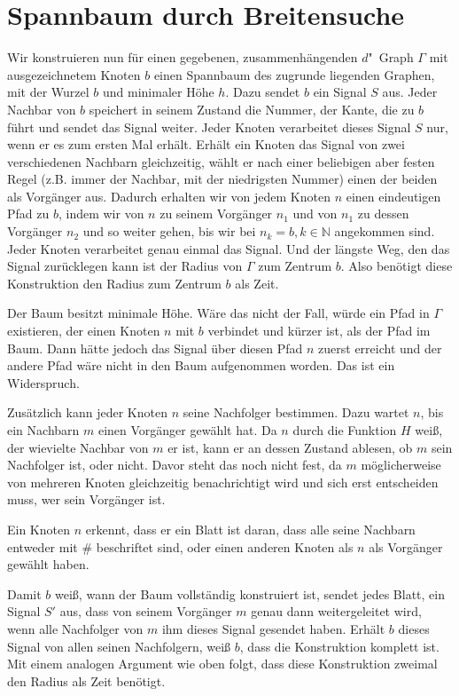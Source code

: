 \documentclass[11pt]{article}
\begin{document}
\section{Spannbaum durch Breitensuche}
Wir konstruieren nun für einen gegebenen, zusammenhängenden $d$"~Graph $\Gamma$ mit ausgezeichnetem Knoten $b$ einen Spannbaum des zugrunde liegenden Graphen, mit der Wurzel $b$ und minimaler Höhe $h$. 
Dazu sendet $b$ ein Signal $S$ aus. Jeder Nachbar von $b$ speichert in seinem Zustand die Nummer, der Kante, die zu $b$ führt und sendet das Signal weiter. 
Jeder Knoten verarbeitet dieses Signal $S$ nur, wenn er es zum ersten Mal erhält. 
Erhält ein Knoten das Signal von zwei verschiedenen Nachbarn gleichzeitig, wählt er nach einer beliebigen aber festen Regel (z.B. immer der Nachbar, mit der niedrigsten Nummer) einen der beiden als Vorgänger aus. 
Dadurch erhalten wir von jedem Knoten $n$ einen eindeutigen Pfad zu $b$, indem wir von $n$ zu seinem Vorgänger $n_1$ und von $n_1$ zu dessen Vorgänger $n_2$ und so weiter gehen, bis wir bei $n_k=b, k \in \mathbb{N}$ angekommen sind. 
Jeder Knoten verarbeitet genau einmal das Signal. 
Und der längste Weg, den das Signal zurücklegen kann ist der Radius von $\Gamma$ zum Zentrum $b$. 
Also benötigt diese Konstruktion den Radius zum Zentrum $b$ als Zeit.

Der Baum besitzt minimale Höhe. 
Wäre das nicht der Fall, würde ein Pfad in $\Gamma$ existieren, der einen Knoten $n$ mit $b$ verbindet und kürzer ist, als der Pfad im Baum. 
Dann hätte jedoch das Signal über diesen Pfad $n$ zuerst erreicht und der andere Pfad wäre nicht in den Baum aufgenommen worden. 
Das ist ein Widerspruch.

Zusätzlich kann jeder Knoten $n$ seine Nachfolger bestimmen. 
Dazu wartet $n$, bis ein Nachbarn $m$ einen Vorgänger gewählt hat.
Da $n$ durch die Funktion $H$ weiß, der wievielte Nachbar von $m$ er ist, kann er an dessen Zustand ablesen, ob $m$ sein Nachfolger ist, oder nicht. 
Davor steht das noch nicht fest, da $m$ möglicherweise von mehreren Knoten gleichzeitig benachrichtigt wird und sich erst entscheiden muss, wer sein Vorgänger ist.

Ein Knoten $n$ erkennt, dass er ein Blatt ist daran, dass alle seine Nachbarn entweder mit $\#$ beschriftet sind, oder einen anderen Knoten als $n$ als Vorgänger gewählt haben.

Damit $b$ weiß, wann der Baum vollständig konstruiert ist, sendet jedes Blatt, ein Signal $S'$ aus, dass von seinem Vorgänger $m$ genau dann weitergeleitet wird, wenn alle Nachfolger von $m$ ihm dieses Signal gesendet haben. 
Erhält $b$ dieses Signal von allen seinen Nachfolgern, weiß $b$, dass die Konstruktion komplett ist.
Mit einem analogen Argument wie oben folgt, dass diese Konstruktion zweimal den Radius als Zeit benötigt.
\end{document}
